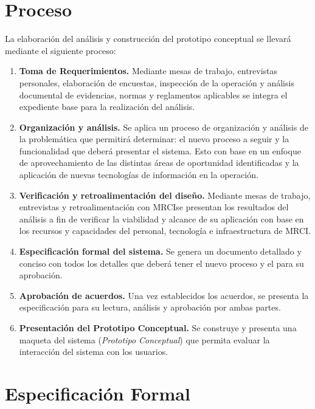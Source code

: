 \documentclass[10pt]{book}
\newcommand{\cliente}{MRCI}
\begin{document}
\section{Proceso}

	La elaboración del análisis y construcción del prototipo conceptual se llevará mediante el siguiente proceso:
	
	
\begin{enumerate}
	\item {\bf Toma de Requerimientos.} Mediante mesas de trabajo, entrevistas personales, elaboración de encuestas, inspección de la operación y análisis documental de evidencias, normas y reglamentos aplicables se integra el expediente base para la realización del análisis.
	\item {\bf Organización y análisis.} Se aplica un proceso de organización y análisis de la problemática que permitirá determinar: el nuevo proceso a seguir y la funcionalidad que deberá presentar el sistema. Esto con base en un enfoque de aprovechamiento de las distintas áreas de oportunidad identificadas y la aplicación de nuevas tecnologías de información en la operación.
	\item {\bf Verificación y retroalimentación del diseño.} Mediante mesas de trabajo, entrevistas y retroalimentación con \cliente se presentan los resultados del análisis a fin de verificar la viabilidad y alcance de su aplicación con base en los recursos y capacidades del personal, tecnología e infraestructura de \cliente.
	\item {\bf Especificación formal del sistema.} Se genera un documento detallado y conciso con todos los detalles que deberá tener el nuevo proceso y el \proyecto para su aprobación.  
	\item {\bf Aprobación de acuerdos.} Una vez establecidos los acuerdos, se presenta la especificación para su lectura, análisis y aprobación por ambas partes.
	\item {\bf Presentación del Prototipo Conceptual.} Se construye y presenta una maqueta del sistema ({\em Prototipo Conceptual}) que permita evaluar la interacción del sistema con los usuarios.
\end{enumerate}

\section{Especificación Formal}
\end{document}
